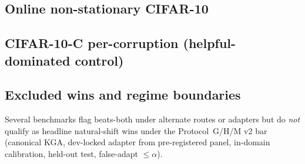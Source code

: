 \subsection{Online non-stationary CIFAR-10}
\begin{table}[h]\centering\small
{}
\caption{Online CIFAR-10 TTA ($3$ seeds/regime). \textsc{KGA} is near-best in both regimes.}
\label{tab:online}
\end{table}

\subsection{CIFAR-10-C per-corruption (helpful-dominated control)}
\begin{table}[h]\centering\small
{}
\caption{Per-corruption CIFAR-10-C: \textsc{KGA} ties always-adapt (safety insurance).}
\label{tab:c10c}
\end{table}

\subsection{Excluded wins and regime boundaries}\label{sec:excluded-wins}
Several benchmarks flag beats-both under alternate routes or adapters but do \emph{not}
qualify as headline natural-shift wins under the Protocol~G/H/M v2 bar (canonical
\textsc{KGA}, dev-locked adapter from pre-registered panel, in-domain calibration,
held-out test, false-adapt $\le\alpha$).

